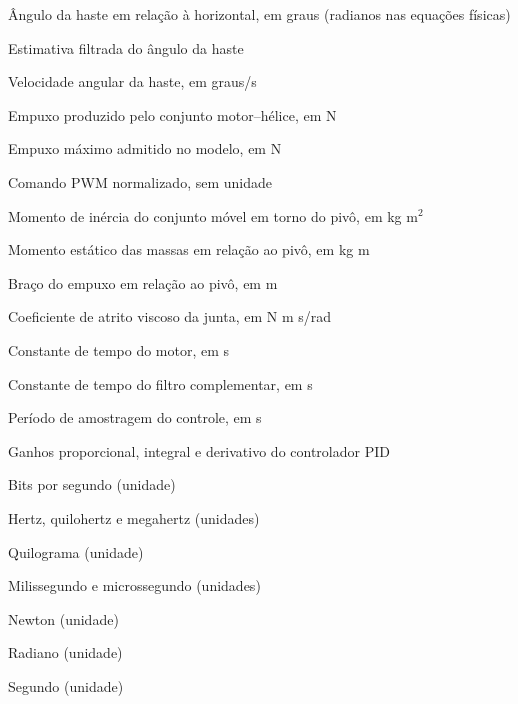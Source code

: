 \begin{simbolos}
    \item[$\theta$] Ângulo da haste em relação à horizontal, em graus (radianos nas equações físicas)
    \item[$\hat{\theta}$] Estimativa filtrada do ângulo da haste
    \item[$\dot{\theta}$] Velocidade angular da haste, em graus/s
    \item[$F$] Empuxo produzido pelo conjunto motor--hélice, em N
    \item[$F_{\max}$] Empuxo máximo admitido no modelo, em N
    \item[$u$] Comando PWM normalizado, sem unidade
    \item[$J$] Momento de inércia do conjunto móvel em torno do pivô, em kg m$^2$
    \item[$S_m$] Momento estático das massas em relação ao pivô, em kg m
    \item[$l_m$] Braço do empuxo em relação ao pivô, em m
    \item[$b$] Coeficiente de atrito viscoso da junta, em N m s/rad
    \item[$\tau_m$] Constante de tempo do motor, em s
    \item[$\tau_f$] Constante de tempo do filtro complementar, em s
    \item[$T_s$] Período de amostragem do controle, em s
    \item[$K_p$, $K_i$, $K_d$] Ganhos proporcional, integral e derivativo do controlador PID
    \item[bit/s] Bits por segundo (unidade)
    \item[Hz, kHz, MHz] Hertz, quilohertz e megahertz (unidades)
    \item[kg] Quilograma (unidade)
    \item[ms, $\mu$s] Milissegundo e microssegundo (unidades)
    \item[N] Newton (unidade)
    \item[rad] Radiano (unidade)
    \item[s] Segundo (unidade)
\end{simbolos}
